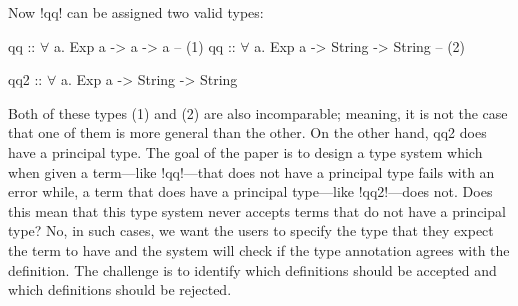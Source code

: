 \documentclass[manuscript,screen,nonacm]{acmart}
\begin{document}
Now !qq! can be assigned two valid types:

\begin{minipage}[ht]{0.5\linewidth}
\begin{codef}
qq :: $\forall$ a. Exp a -> a -> a             -- (1)
qq :: $\forall$ a. Exp a -> String -> String   -- (2)
\end{codef}
\end{minipage}%
\begin{minipage}[ht]{0.4\linewidth}
    qq2 :: $\forall$ a. Exp a -> String -> String
\end{minipage}

Both of these types (1) and (2) are also incomparable; meaning, it is not the case that one of them is more general than the other. On the other hand, qq2 does have a principal type. The goal of the paper is to design a type system which when given a term---like !qq!---that does not have a principal type fails with an error while, a term that does have a principal type---like !qq2!---does not. Does this mean that this type system never accepts terms that do not have a principal type? No, in such cases, we want the users to specify the type that they expect the term to have and the system will check if the type annotation agrees with the definition. The challenge is to identify which definitions should be accepted and which definitions should be rejected.
\end{document}
